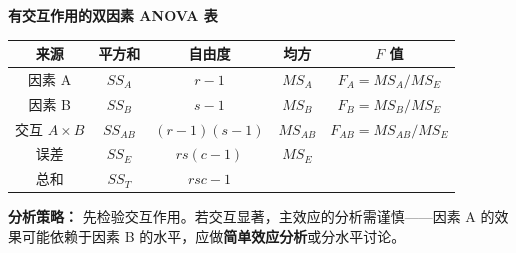 \begin{center}
\textbf{有交互作用的双因素 ANOVA 表}
\begin{tabular}{c|c|c|c|c}
    \toprule
    来源 & 平方和 & 自由度 & 均方 & $F$ 值 \\
    \midrule
    因素 A     & $SS_A$  & $r-1$          & $MS_A$  & $F_A = MS_A/MS_E$ \\
    因素 B     & $SS_B$  & $s-1$          & $MS_B$  & $F_B = MS_B/MS_E$ \\
    交互 $A\!\times\!B$ & $SS_{AB}$ & $(r-1)(s-1)$ & $MS_{AB}$ & $F_{AB} = MS_{AB}/MS_E$ \\
    误差       & $SS_E$  & $rs(c-1)$      & $MS_E$  & \\
    \midrule
    总和       & $SS_T$  & $rsc-1$        & & \\
    \bottomrule
\end{tabular}
\end{center}

\textbf{分析策略：} 先检验交互作用。若交互显著，主效应的分析需谨慎——因素 A 的效果可能依赖于因素 B 的水平，应做\textbf{简单效应分析}或分水平讨论。

